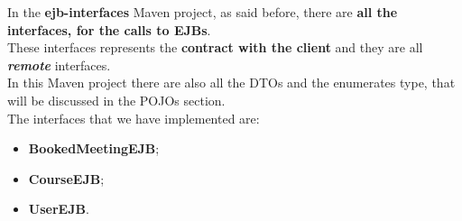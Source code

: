 In the \textbf{ejb-interfaces} Maven project, as said before, there are \textbf{all the interfaces, for the calls to EJBs}. \\
These interfaces represents the \textbf{contract with the client} and they are all \textbf{\textit{remote}} interfaces. \\
In this Maven project there are also all the DTOs and the enumerates type, that will be discussed in the POJOs section.\\

The interfaces that we have implemented are:
\begin{itemize}
    \item \textbf{BookedMeetingEJB};
    \item \textbf{CourseEJB};
    \item \textbf{UserEJB}.
\end{itemize}

